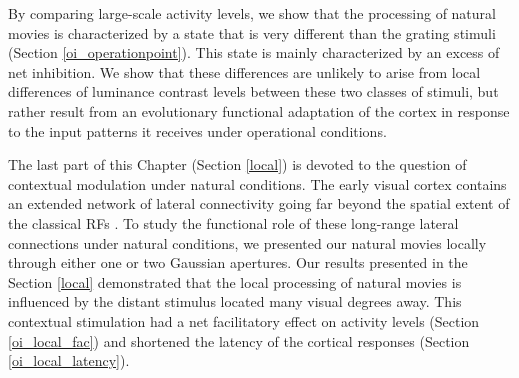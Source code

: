 By comparing large-scale activity levels, we show that the processing of
natural movies is characterized by a state that is very different than the
grating stimuli (Section \ref{oi_operationpoint}). This state is mainly
characterized by an excess of net inhibition. We show that these
differences are unlikely to arise from local differences of luminance
contrast levels between these two classes of stimuli, but rather result
from an evolutionary functional adaptation of the cortex in response to the
input patterns it receives under operational conditions.

The last part of this Chapter (Section \ref{local}) is devoted to the
question of contextual modulation under natural conditions. The early
visual cortex contains an extended network of lateral connectivity going
far beyond the spatial extent of the classical RFs
\citep{series2003a,gilbert1989a}. To study the functional role of these
long-range lateral connections under natural conditions, we presented our
natural movies locally through either one or two Gaussian apertures.  Our
results presented in the Section \ref{local} demonstrated that the local
processing of natural movies is influenced by the distant stimulus located
many visual degrees away. This contextual stimulation had a net
facilitatory effect on activity levels (Section \ref{oi_local_fac}) and
shortened the latency of the cortical responses (Section
\ref{oi_local_latency}).
